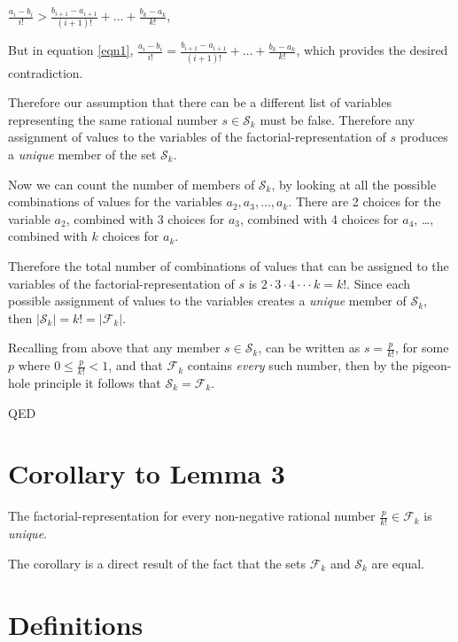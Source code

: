 \documentclass{article}
\begin{document}
\begin{center}
\(\frac{a_i - b_i}{i!} > \frac{b_{i+1} - a_{i+1}}{(i+1)!} + \dots{} + \frac{b_k - a_k}{k!}\),
\end{center}

But in equation \eqref{eqn1},
\(\frac{a_i - b_i}{i!} = \frac{b_{i+1} - a_{i+1}}{(i+1)!} + \dots{} + \frac{b_k - a_k}{k!}\),
which provides the desired contradiction.

Therefore our assumption that there can be a different list
of variables representing the same rational number \(s \in \mathcal{S}_k\) must be false.
Therefore any assignment of values to the variables of the factorial-representation of \(s\)
produces a \emph{unique} member of the set \(\mathcal{S}_k\).

Now we can count the number of members of \(\mathcal{S}_k\), by looking at all the
possible combinations of values for the variables \(a_2, a_3, \dots{}, a_k\).
There are 2 choices for the variable \(a_2\),
combined with 3 choices for \(a_3\),
combined with 4 choices for \(a_4\),
\dots{},
combined with \(k\) choices for \(a_k\).

Therefore the total number of combinations of values
that can be assigned to the variables of
the factorial-representation of \(s\)
is \(2\cdot{}3\cdot{}4\cdot\cdot{}\cdot{}k = k!\). Since each possible assignment of values
to the variables
creates a \emph{unique} member of \(\mathcal{S}_k\),
then \(\left|\mathcal{S}_k\right| = k! = \left|\mathcal{F}_k\right|\).

Recalling from above that any 
member \(s \in \mathcal{S}_k\),
can be written as \(s = \frac{p}{k!}\), for some \(p\) where 
\(0\le{}\frac{p}{k!}<1\), and that \(\mathcal{F}_k\) contains \emph{every} such number,
then by the pigeon-hole principle it follows that \(\mathcal{S}_k = \mathcal{F}_k\).

\hspace*{\fill}QED

\section*{Corollary to Lemma 3}

The factorial-representation for every non-negative rational number \(\frac{p}{k!} \in \mathcal{F}_k\) is 
\emph{unique}.

The corollary is a direct result of the fact that
the sets
\(\mathcal{F}_k\) and
\(\mathcal{S}_k\) are equal.

\section*{Definitions}
\end{document}
